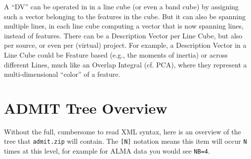 \documentclass{article}
\begin{document}
A ``DV'' can be operated in in a line cube (or even a band cube) by
assigning such a vector belonging to the features in the cube. But
it can also be spanning multiple lines, in each line cube computing a
vector that is now spanning lines, instead of features.  There can be a
Description Vector per Line Cube, but also per source, or even per (virtual)
project. For example, a Description Vector in a Line Cube could be Feature
based (e.g., the moments of inertia) or across different Lines, much like
an Overlap Integral (cf. PCA), where they represent a multi-dimensional
``color'' of a feature.

%

%
%
%
%
%
%
%


\appendix

\section{ADMIT Tree Overview}
Without the full, cumbersome to read XML syntax, here is an overview of
the tree that {\tt admit.zip} will contain.  The {\tt [N]} notation
means this item will occur {\tt N} times at this level, for example for
ALMA data you would see {\tt NB=4}.
\end{document}
